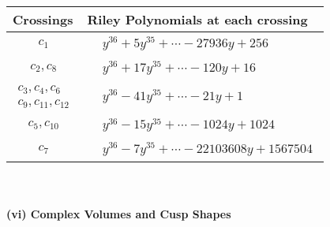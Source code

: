 \documentclass[1p]{elsarticle_modified}
\theoremstyle{definition}
\begin{document}
\begin{tabular}{m{50pt}|m{274pt}}
Crossings & \hspace{64pt}Riley Polynomials at each crossing \\
\hline $$\begin{aligned}c_{1}\end{aligned}$$&$\begin{aligned}
&y^{36}+5 y^{35}+\cdots-27936 y+256
\end{aligned}$\\
\hline $$\begin{aligned}c_{2},c_{8}\end{aligned}$$&$\begin{aligned}
&y^{36}+17 y^{35}+\cdots-120 y+16
\end{aligned}$\\
\hline $$\begin{aligned}c_{3},c_{4},c_{6}\\c_{9},c_{11},c_{12}\end{aligned}$$&$\begin{aligned}
&y^{36}-41 y^{35}+\cdots-21 y+1
\end{aligned}$\\
\hline $$\begin{aligned}c_{5},c_{10}\end{aligned}$$&$\begin{aligned}
&y^{36}-15 y^{35}+\cdots-1024 y+1024
\end{aligned}$\\
\hline $$\begin{aligned}c_{7}\end{aligned}$$&$\begin{aligned}
&y^{36}-7 y^{35}+\cdots-22103608 y+1567504
\end{aligned}$\\
\hline
\end{tabular}\\~\\
\newpage\flushleft \textbf{(vi) Complex Volumes and Cusp Shapes}
\end{document}
